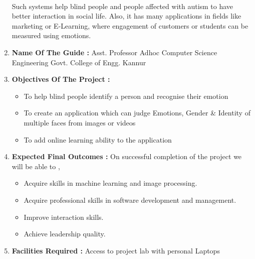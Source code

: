 \documentclass[12pt,a4paper]{article}
\begin{document}
\begin{flushleft}
\begin{enumerate}
			\paragraph{} Such systems help blind people and people affected with autism to have better interaction in social life. Also, it has many applications in fields like marketing or E-Learning, where engagement of customers or students can be measured using emotions.		
			\newline
		\item {\bfseries Name Of The Guide :}\newline\newline
			\setlength{\parindent}{1cm}
			\newline
			\indent Asst. Professor Adhoc \newline
			\indent Computer Science Engineering \newline
			\indent Govt. College of Engg. Kannur \newline
			
		\item {\bfseries Objectives Of The Project : }
		\begin{itemize}
			\item To help blind people identify a person and recognise their emotion
			\item To create an application which can judge Emotions, Gender \& Identity of multiple faces from images or videos
			\item To add online learning ability to the application
		\end{itemize}
		
		\item {\bfseries Expected Final Outcomes : } \newline
		On successful completion of the project we will be able to ,
		\begin{itemize}
			\item Acquire skills in machine learning and image processing.
			\item Acquire professional skills in software development and management.
			\item Improve interaction skills.
			\item Achieve leadership quality.
		\end{itemize}
		
		\item {\bfseries Facilities Required : } \newline
		\setlength{\parindent}{1cm}
		\indent Access to project lab with personal Laptops
		

\end{enumerate}
\end{flushleft}
\end{document}
